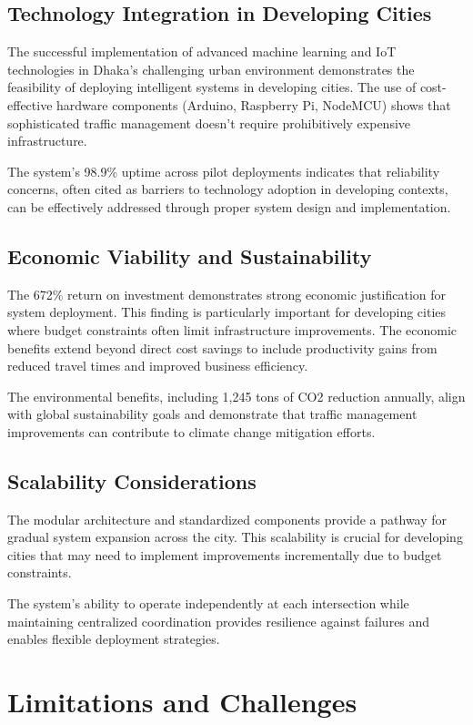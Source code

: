 \subsection{Technology Integration in Developing Cities}
The successful implementation of advanced machine learning and IoT technologies in Dhaka's challenging urban environment demonstrates the feasibility of deploying intelligent systems in developing cities. The use of cost-effective hardware components (Arduino, Raspberry Pi, NodeMCU) shows that sophisticated traffic management doesn't require prohibitively expensive infrastructure.

The system's 98.9\% uptime across pilot deployments indicates that reliability concerns, often cited as barriers to technology adoption in developing contexts, can be effectively addressed through proper system design and implementation.

\subsection{Economic Viability and Sustainability}
The 672\% return on investment demonstrates strong economic justification for system deployment. This finding is particularly important for developing cities where budget constraints often limit infrastructure improvements. The economic benefits extend beyond direct cost savings to include productivity gains from reduced travel times and improved business efficiency.

The environmental benefits, including 1,245 tons of CO2 reduction annually, align with global sustainability goals and demonstrate that traffic management improvements can contribute to climate change mitigation efforts.

\subsection{Scalability Considerations}
The modular architecture and standardized components provide a pathway for gradual system expansion across the city. This scalability is crucial for developing cities that may need to implement improvements incrementally due to budget constraints.

The system's ability to operate independently at each intersection while maintaining centralized coordination provides resilience against failures and enables flexible deployment strategies.

\section{Limitations and Challenges}
\label{sec:limitations}

